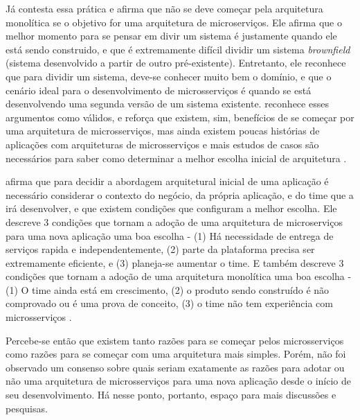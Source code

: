 Já  contesta essa prática e afirma que não se deve começar pela arquitetura monolítica se o objetivo for uma arquitetura de microserviços. Ele afirma que o melhor momento para se pensar em divir um sistema é justamente quando ele está sendo construido, e que é extremamente difícil dividir um sistema \emph{brownfield} (sistema desenvolvido a partir de outro pré-existente). Entretanto, ele reconhece que para dividir um sistema, deve-se conhecer muito bem o domínio, e que o cenário ideal para o desenvolvimento de microsserviços é quando se está desenvolvendo uma segunda versão de um sistema existente.  reconhece esses argumentos como válidos, e reforça que existem, sim, benefícios de se começar por uma arquitetura de microsserviços, mas ainda existem poucas histórias de aplicações com arquiteturas de microsserviços e mais estudos de casos são necessários para saber como determinar a melhor escolha inicial de arquitetura \cite{dontStartWithMonolith-tilkov,martin-fowler-monolith-first}.


 afirma que para decidir a abordagem arquitetural inicial de uma aplicação é necessário considerar o contexto do negócio, da própria aplicação, e do time que a irá desenvolver, e que existem condições que configuram a melhor escolha. Ele descreve 3 condições que tornam a adoção de uma arquitetura de microserviços para uma nova aplicação uma boa escolha - (1) Há necessidade de entrega de serviços rapida e independentemente, (2) parte da plataforma precisa ser extremamente eficiente, e (3) planeja-se aumentar o time. E também descreve 3 condições que tornam a adoção de uma arquitetura monolítica uma boa escolha - (1) O time ainda está em crescimento, (2) o produto sendo construído é não comprovado ou é uma prova de conceito, (3) o time não tem experiência com microsserviços \cite{monolith-or-microservices}.

Percebe-se então que existem tanto razões para se começar pelos microsserviços como razões para se começar com uma arquitetura mais simples. Porém, não foi observado um consenso sobre quais seriam exatamente as razões para adotar ou não uma arquitetura de microsserviços para uma nova aplicação desde o início de seu desenvolvimento. Há nesse ponto, portanto, espaço para mais discussões e pesquisas.

